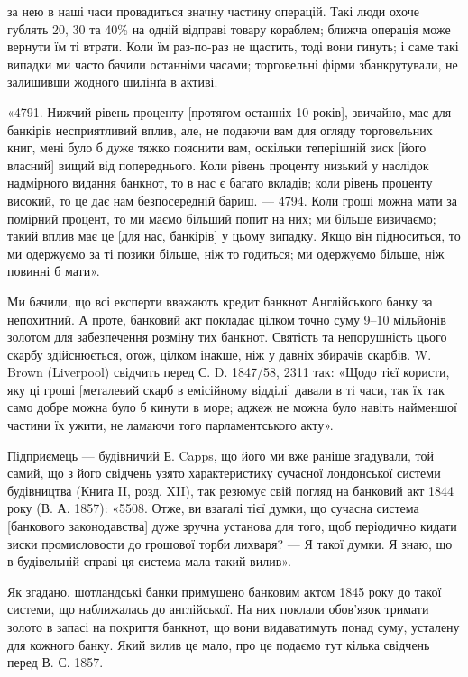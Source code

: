 \parcont{}  %
за нею в наші часи провадиться значну частину операцій. Такі люди охоче
гублять 20, 30 та 40\% на одній відправі товару кораблем; ближча операція
може вернути їм ті втрати. Коли їм раз-по-раз не щастить, тоді вони гинуть;
і саме такі випадки ми часто бачили останніми часами; торговельні фірми
збанкрутували, не залишивши жодного шилінґа в активі.

«4791. Нижчий рівень проценту [протягом останніх 10 років], звичайно,
має для банкірів несприятливий вплив, але, не подаючи вам для огляду торговельних
книг, мені було б дуже тяжко пояснити вам, оскільки теперішній
зиск [його власний] вищий від попереднього. Коли рівень проценту низький у
наслідок надмірного видання банкнот, то в нас є багато вкладів; коли рівень
проценту високий, то це дає нам безпосередній бариш. — 4794. Коли гроші можна
мати за помірний процент, то ми маємо більший попит на них; ми більше
визичаємо; такий вплив має це [для нас, банкірів] у цьому випадку. Якщо він
підноситься, то ми одержуємо за ті позики більше, ніж то годиться; ми одержуємо
більше, ніж повинні б мати».

Ми бачили, що всі експерти вважають кредит банкнот Англійського банку
за непохитний. А проте, банковий акт покладає цілком точно суму 9--10
мільйонів золотом для забезпечення розміну тих банкнот. Святість та непорушність
цього скарбу здійснюється, отож, цілком інакше, ніж у давніх збирачів
скарбів. W. Brown (Liverpool) свідчить перед С. D. 1847/58, 2311 так: «Щодо
тієї користи, яку ці гроші [металевий скарб в емісійному відділі] давали в ті
часи, так їх так само добре можна було б кинути в море; аджеж не можна було
навіть найменшої частини їх ужити, не ламаючи того парламентського акту».

Підприємець — будівничий Е. Capps, що його ми вже раніше згадували,
той самий, що з його свідчень узято характеристику сучасної лондонської системи
будівництва (Книга II, розд. XII), так резюмує свій погляд на банковий
акт 1844 року (В. А. 1857): «5508. Отже, ви взагалі тієї думки, що сучасна
система [банкового законодавства] дуже зручна установа для того, щоб періодично
кидати зиски промисловости до грошової торби лихваря? — Я такої думки.
Я знаю, що в будівельній справі ця система мала такий вилив».

Як згадано, шотландські банки примушено банковим актом 1845 року до
такої системи, що наближалась до англійської. На них поклали обов’язок тримати
золото в запасі на покриття банкнот, що вони видаватимуть понад суму,
усталену для кожного банку. Який вилив це мало, про це подаємо тут кілька
свідчень перед В. С. 1857.

